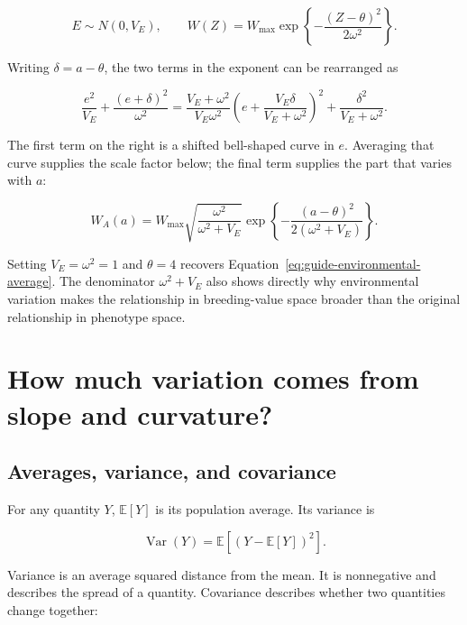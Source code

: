 \documentclass[11pt]{article}
\newcommand{\E}{\mathbb{E}}
\newcommand{\Var}{\operatorname{Var}}
\begin{document}
\begin{equation}
E\sim N(0,V_E),\qquad
W(Z)=W_{\max}\exp\left\{-\frac{(Z-\theta)^2}{2\omega^2}\right\}.
\end{equation}

Writing $\delta=a-\theta$, the two terms in the exponent can be rearranged as

\begin{equation}
\frac{e^2}{V_E}+\frac{(e+\delta)^2}{\omega^2}
=\frac{V_E+\omega^2}{V_E\omega^2}
 \left(e+\frac{V_E\delta}{V_E+\omega^2}\right)^2
 +\frac{\delta^2}{V_E+\omega^2}.
\label{eq:guide-general-completing-square}
\end{equation}

The first term on the right is a shifted bell-shaped curve in $e$.  Averaging
that curve supplies the scale factor below; the final term supplies the part
that varies with $a$:

\begin{equation}
W_A(a)=W_{\max}\sqrt{\frac{\omega^2}{\omega^2+V_E}}
\exp\left\{-\frac{(a-\theta)^2}{2(\omega^2+V_E)}\right\}.
\label{eq:guide-environmental-average-general}
\end{equation}

Setting $V_E=\omega^2=1$ and $\theta=4$ recovers
Equation~\eqref{eq:guide-environmental-average}.  The denominator
$\omega^2+V_E$ also shows directly why environmental variation makes the
relationship in breeding-value space broader than the original relationship
in phenotype space.

\section{How much variation comes from slope and curvature?}
\label{sec:s1}

\subsection{Averages, variance, and covariance}

For any quantity $Y$, $\E[Y]$ is its population average.  Its variance is

\begin{equation}
\Var(Y)=\E\left[(Y-\E[Y])^2\right].
\end{equation}

Variance is an average squared distance from the mean.  It is nonnegative and
describes the spread of a quantity.  Covariance describes whether two
quantities change together:
\end{document}
